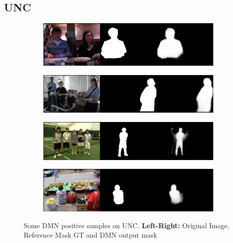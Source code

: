 \newpage
\subsection*{UNC}
\begin{figure}[!htbp]
    \centering
    \begin{subfigure}[b]{\columnwidth}
            \centering
            \includegraphics[width=\textwidth]{./figures/unc_samples/1.png}
    \end{subfigure}
    
    \begin{subfigure}[b]{\columnwidth}
            \centering
            \includegraphics[width=\textwidth]{./figures/unc_samples/2.png}
    \end{subfigure}
    
    \begin{subfigure}[b]{\columnwidth}
            \centering
            \includegraphics[width=\textwidth]{./figures/unc_samples/3.png}
    \end{subfigure}
    
    \begin{subfigure}[b]{\columnwidth}
            \centering
            \includegraphics[width=\textwidth]{./figures/unc_samples/4.png}
    \end{subfigure}
    \caption{Some DMN positive samples on UNC. \textbf{Left-Right:} Original Image, Reference Mask GT and DMN output mask}
    \label{Fig:UNC_Pos}
\end{figure}
